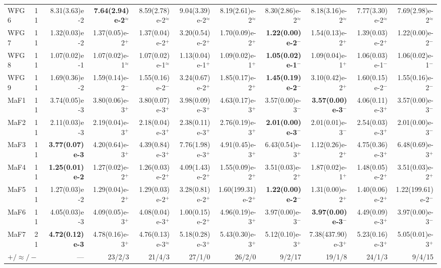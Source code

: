 \begin{longtable}{llrrrrrrrrr}
WFG6 & 11 & 8.31(3.63)e-2 & \textbf{7.64(2.94)e-2}$^{\approx}$ & 8.59(2.78)e-2$^{\approx}$ & 9.04(3.39)e-2$^{\approx}$ & 8.19(2.61)e-2$^{\approx}$ & 8.30(2.86)e-2$^{\approx}$ & 8.18(3.16)e-2$^{\approx}$ & 7.77(3.30)e-2$^{\approx}$ & 7.69(2.98)e-2$^{\approx}$ \\
WFG7 & 11 & 1.32(0.03)e-2 & 1.37(0.05)e-2$^{+}$ & 1.37(0.04)e-2$^{+}$ & 3.20(0.54)e-2$^{+}$ & 1.70(0.09)e-2$^{+}$ & \textbf{1.22(0.00)e-2}$^{-}$ & 1.54(0.13)e-2$^{+}$ & 1.39(0.03)e-2$^{+}$ & 1.22(0.00)e-2$^{-}$ \\
WFG8 & 11 & 1.07(0.02)e-1 & 1.07(0.02)e-1$^{\approx}$ & 1.07(0.02)e-1$^{\approx}$ & 1.13(0.04)e-1$^{+}$ & 1.09(0.02)e-1$^{+}$ & \textbf{1.05(0.02)e-1}$^{-}$ & 1.09(0.04)e-1$^{+}$ & 1.06(0.03)e-1$^{-}$ & 1.06(0.02)e-1$^{-}$ \\
WFG9 & 11 & 1.69(0.36)e-2 & 1.59(0.14)e-2$^{-}$ & 1.55(0.16)e-2$^{-}$ & 3.24(0.67)e-2$^{+}$ & 1.85(0.17)e-2$^{+}$ & \textbf{1.45(0.19)e-2}$^{-}$ & 3.10(0.42)e-2$^{+}$ & 1.60(0.15)e-2$^{-}$ & 1.55(0.16)e-2$^{-}$ \\
\midrule
MaF1 & 11 & 3.74(0.05)e-3 & 3.80(0.06)e-3$^{+}$ & 3.80(0.07)e-3$^{+}$ & 3.98(0.09)e-3$^{+}$ & 4.63(0.17)e-3$^{+}$ & 3.57(0.00)e-3$^{-}$ & \textbf{3.57(0.00)e-3}$^{-}$ & 4.06(0.11)e-3$^{+}$ & 3.57(0.00)e-3$^{-}$ \\
MaF2 & 11 & 2.11(0.03)e-3 & 2.19(0.04)e-3$^{+}$ & 2.18(0.04)e-3$^{+}$ & 2.38(0.11)e-3$^{+}$ & 2.76(0.19)e-3$^{+}$ & \textbf{2.01(0.00)e-3}$^{-}$ & 2.01(0.01)e-3$^{-}$ & 2.54(0.03)e-3$^{+}$ & 2.01(0.00)e-3$^{-}$ \\
MaF3 & 11 & \textbf{3.77(0.07)e-3} & 4.20(0.64)e-3$^{+}$ & 4.39(0.84)e-3$^{+}$ & 7.76(1.98)e-3$^{+}$ & 4.91(0.45)e-3$^{+}$ & 6.43(0.54)e-3$^{+}$ & 1.12(0.26)e-2$^{+}$ & 4.75(0.36)e-3$^{+}$ & 6.48(0.69)e-3$^{+}$ \\
MaF4 & 11 & \textbf{1.25(0.01)e-2} & 1.27(0.02)e-2$^{+}$ & 1.26(0.03)e-2$^{+}$ & 4.09(1.43)e-2$^{+}$ & 1.55(0.09)e-2$^{+}$ & 3.51(0.03)e-2$^{+}$ & 1.87(0.02)e-1$^{+}$ & 1.48(0.05)e-2$^{+}$ & 3.51(0.03)e-2$^{+}$ \\
MaF5 & 11 & 1.27(0.03)e-2 & 1.29(0.04)e-2$^{+}$ & 1.29(0.03)e-2$^{+}$ & 3.28(0.81)e-2$^{+}$ & 1.60(199.31)e-2$^{+}$ & \textbf{1.22(0.00)e-2}$^{-}$ & 1.31(0.00)e-2$^{+}$ & 1.40(0.06)e-2$^{+}$ & 1.22(199.61)e-2$^{-}$ \\
MaF6 & 11 & 4.05(0.03)e-3 & 4.09(0.05)e-3$^{+}$ & 4.08(0.04)e-3$^{+}$ & 1.00(0.15)e-2$^{+}$ & 4.96(0.19)e-3$^{+}$ & 3.97(0.00)e-3$^{-}$ & \textbf{3.97(0.00)e-3}$^{-}$ & 4.49(0.09)e-3$^{+}$ & 3.97(0.00)e-3$^{-}$ \\
MaF7 & 21 & \textbf{4.72(0.12)e-3} & 4.78(0.16)e-3$^{+}$ & 4.76(0.13)e-3$^{\approx}$ & 5.18(0.28)e-3$^{+}$ & 5.43(0.30)e-3$^{+}$ & 5.12(0.10)e-3$^{+}$ & 7.38(437.90)e-3$^{+}$ & 5.23(0.16)e-3$^{+}$ & 5.05(0.01)e-3$^{+}$ \\
\midrule
\multicolumn{2}{l}{$+/\approx/-$} & --- & 23/2/3 & 21/4/3 & 27/1/0 & 26/2/0 & 9/2/17 & 19/1/8 & 24/1/3 & 9/4/15 \\
\end{longtable}